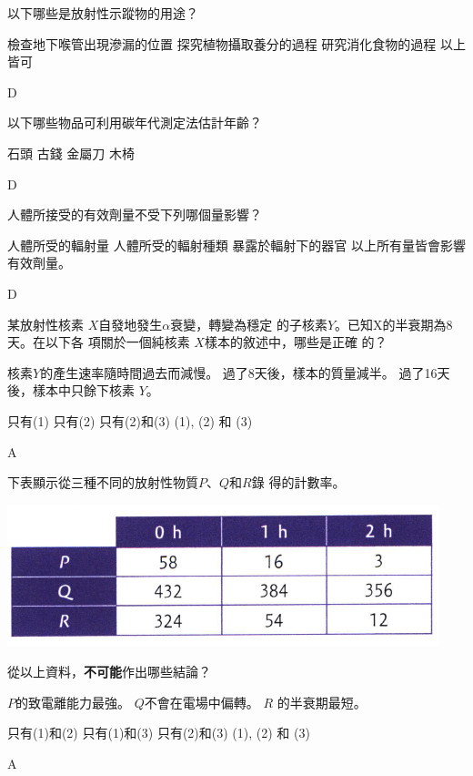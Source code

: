 {
    以下哪些是放射性示蹤物的用途？
    \begin{tasks}
        \task 檢查地下喉管出現滲漏的位置
        \task 探究植物攝取養分的過程
        \task 研究消化食物的過程
        \task 以上皆可
    \end{tasks}
}{D}

{
    以下哪些物品可利用碳年代測定法估計年齡？
    \begin{tasks}
        \task 石頭
        \task 古錢
        \task 金屬刀
        \task 木椅
    \end{tasks}
}{D}

{
    人體所接受的有效劑量不受下列哪個量影響？
    \begin{tasks}
        \task 人體所受的輻射量
        \task 人體所受的輻射種類
        \task 暴露於輻射下的器官
        \task 以上所有量皆會影響有效劑量。
    \end{tasks}
}{D}

{
    某放射性核素 $X$自發地發生$\alpha$衰變，轉變為穩定 的子核素$Y$。已知X的半衰期為8天。在以下各 項關於一個純核素 $X$樣本的敘述中，哪些是正確 的？
    \begin{statements}
        \task 核素$Y$的產生速率隨時間過去而減慢。
        \task 過了8天後，樣本的質量減半。
        \task 過了16天後，樣本中只餘下核素 $Y$。
    \end{statements}
    \begin{tasks}
        \task 只有(1)
        \task 只有(2)
        \task 只有(2)和(3)
        \task (1), (2) 和 (3)
    \end{tasks}

}{A}

{
    下表顯示從三種不同的放射性物質$P$、$Q$和$R$錄 得的計數率。
    \par{\par\centering\includegraphics[width=.5\textwidth]{./img/ch2_decay_mc_2024-06-17-22-31-05.png}\par}
    從以上資料，\textbf{不可能}作出哪些結論？
    \begin{statements}
        \task $P$的致電離能力最強。
        \task $Q$不會在電場中偏轉。
        \task $R$ 的半衰期最短。
    \end{statements}
    \begin{tasks}
        \task 只有(1)和(2)
        \task 只有(1)和(3)
        \task 只有(2)和(3)
        \task (1), (2) 和 (3)
    \end{tasks}

}{A}


